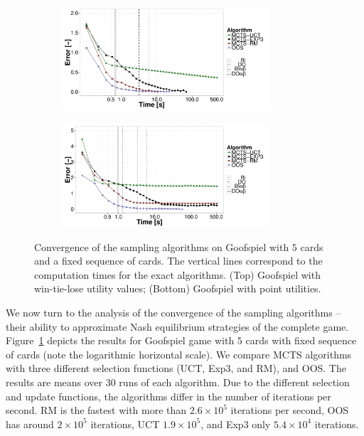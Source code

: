 \begin{figure}[t!]
	\begin{subfigure}{1\textwidth}
		\centering
		\includegraphics[width=0.85\textwidth]{figures/convergence-gs-tf.pdf}%
	\end{subfigure}
	\begin{subfigure}{1\textwidth}
		\centering
		\includegraphics[width=0.85\textwidth]{figures/convergence-gs-ff.pdf}%
	\end{subfigure}
\caption{Convergence of the sampling algorithms on Goofspiel with $5$ cards and a fixed sequence of cards.
The vertical lines correspond to the computation times for the exact algorithms.
(Top) Goofspiel with win-tie-lose utility values;
(Bottom) Goofspiel with point utilities.} \label{fig:off:conv:gs}
\end{figure}

We now turn to the analysis of the convergence of the sampling algorithms -- \ie their ability to approximate Nash equilibrium strategies of the complete game.
Figure~\ref{fig:off:conv:gs} depicts the results for Goofspiel game with $5$ cards with fixed sequence of cards (note the logarithmic horizontal scale).
We compare MCTS algorithms with three different selection functions (UCT, Exp3, and RM), and OOS.
The results are means over $30$ runs of each algorithm.
Due to the different selection and update functions, the algorithms differ in the number of iterations per second.
RM is the fastest with more than $2.6\times 10^5$ iterations per second, OOS has around $2\times10^5$ iterations, UCT $1.9\times10^5$, and Exp3 only $5.4\times10^4$ iterations.

